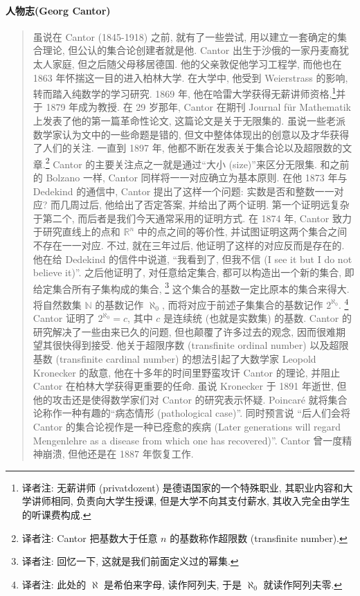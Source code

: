 \documentclass[lang=cn,zihao=-4,twoside,fontset=none]{textbook}
\begin{document}
\paragraph*{人物志(Georg Cantor)}
\begin{quotation}
{
虽说在 Cantor (1845-1918) 之前, 就有了一些尝试, 用以建立一套确定的集合理论, 但公认的集合论创建者就是他. Cantor 出生于沙俄的一家丹麦裔犹太人家庭, 但之后随父母移居德国. 他的父亲敦促他学习工程学, 而他也在 1863 年怀揣这一目的进入柏林大学. 在大学中, 他受到 Weierstrass 的影响, 转而踏入纯数学的学习研究. 1869 年, 他在哈雷大学获得无薪讲师资格,\footnote{译者注: 无薪讲师 (privatdozent) 是德语国家的一个特殊职业, 其职业内容和大学讲师相同, 负责向大学生授课, 但是大学不向其支付薪水, 其收入完全由学生的听课费构成.}并于 1879 年成为教授. 在 29 岁那年, Cantor 在期刊 Journal für Mathematik 上发表了他的第一篇革命性论文, 这篇论文是关于无限集的. 虽说一些老派数学家认为文中的一些命题是错的, 但文中整体体现出的创意以及才华获得了人们的关注. 一直到 1897 年, 他都不断在发表关于集合论以及超限数的文章.\footnote{译者注: Cantor 把基数大于任意 $n$ 的基数称作超限数 (transfinite number).} Cantor 的主要关注点之一就是通过“大小 (size)”来区分无限集. 和之前的 Bolzano 一样, Cantor 同样将一一对应确立为基本原则. 在他 1873 年与 Dedekind 的通信中, Cantor 提出了这样一个问题: 实数是否和整数一一对应? 而几周过后, 他给出了否定答案, 并给出了两个证明. 第一个证明远复杂于第二个, 而后者是我们今天通常采用的证明方式. 在 1874 年, Cantor 致力于研究直线上的点和 $\mathbb R^n$ 中的点之间的等价性, 并试图证明这两个集合之间不存在一一对应. 不过, 就在三年过后, 他证明了这样的对应反而是存在的. 他在给 Dedekind 的信件中说道, ``我看到了, 但我不信 (I see it but I do not believe it)''. 之后他证明了, 对任意给定集合, 都可以构造出一个新的集合, 即给定集合所有子集构成的集合, \footnote{译者注: 回忆一下, 这就是我们前面定义过的幂集.} 这个集合的基数一定比原本的集合来得大. 将自然数集 $\mathbb N$ 的基数记作 $\aleph_0$, 而将对应于前述子集集合的基数记作 $2^{\aleph_0}$. \footnote{译者注: 此处的 $\aleph$ 是希伯来字母, 读作阿列夫, 于是 $\aleph_0$ 就读作阿列夫零.} Cantor 证明了 $2^{\aleph_0}=c$, 其中 $c$ 是连续统 (也就是实数集) 的基数. Cantor 的研究解决了一些由来已久的问题, 但也颠覆了许多过去的观念, 因而很难期望其很快得到接受. 他关于超限序数 (transfinite ordinal number) 以及超限基数 (transfinite cardinal number) 的想法引起了大数学家 Leopold Kronecker 的敌意, 他在十多年的时间里野蛮攻讦 Cantor 的理论, 并阻止 Cantor 在柏林大学获得更重要的任命. 虽说 Kronecker 于 1891 年逝世, 但他的攻击还是使得数学家们对 Cantor 的研究表示怀疑. Poincaré 就将集合论称作一种有趣的“病态情形 (pathological case)”. 同时预言说 “后人们会将 Cantor 的集合论视作是一种已痊愈的疾病 (Later generations will regard Mengenlehre as a disease from which one has recovered)”. Cantor 曾一度精神崩溃, 但他还是在 1887 年恢复工作.

}
\end{quotation}
\end{document}
